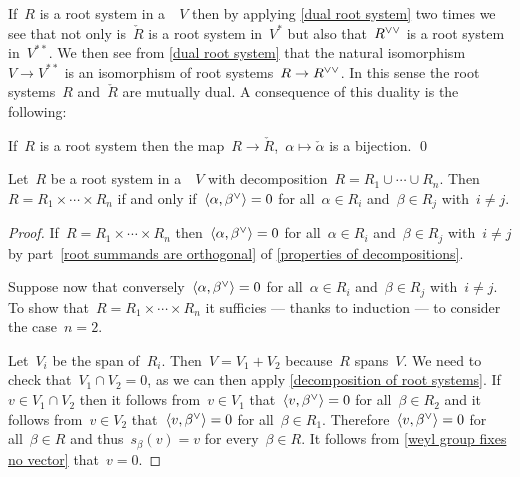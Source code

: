 \begin{remark}
  If~$R$ is a root system in a~{\vectorspace{$\kf$}}~$V$ then by applying \cref{dual root system} two times we see that not only is~$\check{R}$ is a root system in~$V^*$ but also that~$\dcheck{R}$ is a root system in~$V^{**}$.
  We then see from \cref{dual root system} that the natural isomorphism~$V \to V^{**}$ is an isomorphism of root systems~$R \to \dcheck{R}$.
  In this sense the root systems~$R$ and~$\check{R}$ are mutually dual.
  A consequence of this duality is the following:
\end{remark}


\begin{corollary}
  If~$R$ is a root system then the map~$R \to \check{R}$,~$\alpha \mapsto \check{\alpha}$ is a bijection.
  \qed
\end{corollary}


\begin{corollary}
  Let~$R$ be a root system in a~{\vectorspace{$\kf$}}~$V$ with decomposition~$R = R_1 \cup \dotsb \cup R_n$.
  Then~$R = R_1 \times \dotsb \times R_n$ if and only if~$\pair{\alpha, \check{\beta}} = 0$ for all~$\alpha \in R_i$ and~$\beta \in R_j$ with~$i \neq j$.
\end{corollary}


\begin{proof}
  If~$R = R_1 \times \dotsb \times R_n$ then~$\pair{\alpha, \check{\beta}} = 0$ for all~$\alpha \in R_i$ and~$\beta \in R_j$ with~$i \neq j$ by part~\ref*{root summands are orthogonal} of \cref{properties of decompositions}.
  
  Suppose now that conversely~$\pair{\alpha, \check{\beta}} = 0$ for all~$\alpha \in R_i$ and~$\beta \in R_j$ with~$i \neq j$.
  To show that~$R = R_1 \times \dotsb \times R_n$ it sufficies --- thanks to induction --- to consider the case~$n = 2$.
  
  Let~$V_i$ be the span of~$R_i$.
  Then~$V = V_1 + V_2$ because~$R$ spans~$V$.
  We need to check that~$V_1 \cap V_2 = 0$, as we can then apply \cref{decomposition of root systems}.
  If~$v \in V_1 \cap V_2$ then it follows from~$v \in V_1$ that~$\pair{v, \check{\beta}} = 0$ for all~$\beta \in R_2$ and it follows from~$v \in V_2$ that~$\pair{v, \check{\beta}} = 0$ for all~$\beta \in R_1$.
  Therefore~$\pair{v, \check{\beta}} = 0$ for all~$\beta \in R$ and thus~$s_\beta(v) = v$ for every~$\beta \in R$.
  It follows from \cref{weyl group fixes no vector} that~$v = 0$.
\end{proof}


